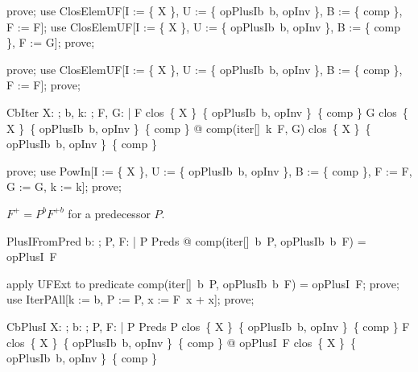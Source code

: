 \documentclass{article}
\begin{document}
\begin{zproof}
prove;
use ClosElemUF[I := \{ X \}, U := \{ opPlusIb~b, opInv \}, B := \{ comp \}, F := F];
use ClosElemUF[I := \{ X \}, U := \{ opPlusIb~b, opInv \}, B := \{ comp \}, F := G];
prove;
\end{zproof}


\begin{zproof}
prove;
use ClosElemUF[I := \{ X \}, U := \{ opPlusIb~b, opInv \}, B := \{ comp \}, F := F];
prove;
\end{zproof}

\begin{theorem}{CbIter}
  \forall X: \nat \fun \nat; b, k: \nat; F, G: \nat \fun \nat | F \in clos~\{ X \}~\{ opPlusIb~b, opInv \}~\{ comp \} \land G \in clos~\{ X \}~\{ opPlusIb~b, opInv \}~\{ comp \} @ comp(iter[\nat]~k~F, G) \in clos~\{ X \}~\{ opPlusIb~b, opInv \}~\{ comp \}
\end{theorem}

\begin{zproof}
prove;
use PowIn[I := \{ X \}, U := \{ opPlusIb~b, opInv \}, B := \{ comp \}, F := F, G := G, k := k];
prove;
\end{zproof}

$F^+ = P^b F^{+b}$ for a predecessor $P$.

\begin{theorem}{PlusIFromPred}
  \forall b: \nat; P, F: \nat \fun \nat | P \in Preds @ comp(iter[\nat]~b~P, opPlusIb~b~F) = opPlusI~F
\end{theorem}

\begin{zproof}
apply UFExt to predicate comp(iter[\nat]~b~P, opPlusIb~b~F) = opPlusI~F;
prove;
use IterPAll[k := b, P := P, x := F~x + x];
prove;
\end{zproof}

\begin{theorem}{CbPlusI}
  \forall X: \nat \fun \nat; b: \nat; P, F: \nat \fun \nat | P \in Preds \land P \in clos~\{ X \}~\{ opPlusIb~b, opInv \}~\{ comp \} \land F \in clos~\{ X \}~\{ opPlusIb~b, opInv \}~\{ comp \} @ opPlusI~F \in clos~\{ X \}~\{ opPlusIb~b, opInv \}~\{ comp \}
\end{theorem}
\end{document}
